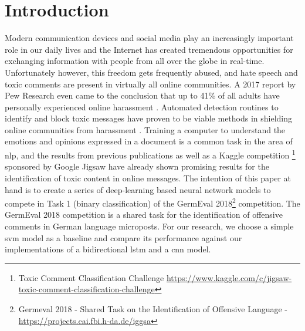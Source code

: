 \documentclass[11pt]{article}
\begin{document}
\section{Introduction}
Modern communication devices and social media play an increasingly important role in our daily lives and the Internet has created tremendous opportunities for exchanging information with people from all over the globe in real-time. Unfortunately however, this freedom gets frequently abused, and hate speech and toxic comments are present in virtually all online communities. A 2017 report by Pew Research even came to the conclusion that up to 41\% of all adults have personally experienced online harassment \cite{RN63}.
\newline
Automated detection routines to identify and block toxic messages have proven to be viable methods in shielding online communities from harassment \cite{RN27}. Training a computer to understand the emotions and opinions expressed in a document is a common task in the area of \ac{nlp}, and the results from previous publications  \cite{RN14} as well as a Kaggle competition \footnote{Toxic Comment Classification Challenge \url{https://www.kaggle.com/c/jigsaw-toxic-comment-classification-challenge}} sponsored by Google Jigsaw have already shown promising results for the identification of toxic content in online messages.
\newline
The intention of this paper at hand is to create a series of deep-learning based neural network models to compete in Task 1 (binary classification) of the GermEval 2018\footnote{\label{footnote:germ2018}Germeval 2018 - Shared Task on the Identification of Offensive Language - \url{https://projects.cai.fbi.h-da.de/iggsa}} competition. The GermEval 2018 competition is a shared task for the identification of offensive comments in German language microposts. For our research, we choose a simple \ac{svm} model as a baseline and compare its performance against our implementations of a bidirectional \ac{lstm} and a \ac{cnn} model. 
\end{document}
